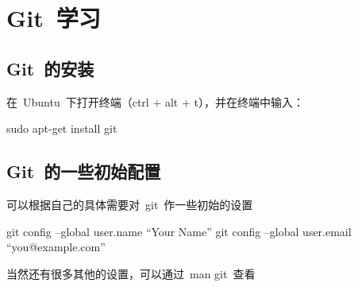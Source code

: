 \chapter{Git~学习}

\section{Git~的安装}
在~Ubuntu~下打开终端（ctrl + alt + t），并在终端中输入：
 \begin{code}
 sudo apt-get install git
 \end{code}
 
\section{Git~的一些初始配置}
可以根据自己的具体需要对~git~作一些初始的设置
\begin{code}
git config --global user.name “Your Name”
git config --global user.email “you@example.com”
\end{code}
当然还有很多其他的设置，可以通过~man git~查看